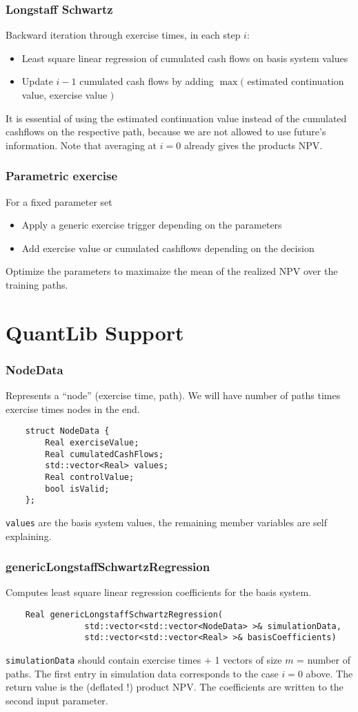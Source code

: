\documentclass{beamer}
\begin{document}
\begin{frame}
\frametitle{Longstaff Schwartz}
Backward iteration through exercise times, in each step $i$:
\begin{itemize}
\item Least square linear regression of cumulated cash flows on basis system values
\item Update $i-1$ cumulated cash flows by adding $\max($ estimated continuation value, exercise value $)$
\end{itemize}
It is essential of using the estimated continuation value instead of the cumulated cashflows
on the respective path, because we are not allowed to use future's information.
Note that averaging at $i=0$ already gives the products NPV.
\end{frame}

\begin{frame}
\frametitle{Parametric exercise}
For a fixed parameter set
\begin{itemize}
\item Apply a generic exercise trigger depending on the parameters
\item Add exercise value or cumulated cashflows depending on the decision
\end{itemize}
Optimize the parameters to maximaize the mean of the realized NPV over the training paths.
\end{frame}


\section{QuantLib Support}

\begin{frame}[fragile]
\frametitle{NodeData}
Represents a ``node'' (exercise time, path). We will have number of paths times
exercise times nodes in the end.
\begin{verbatim}
    struct NodeData {
        Real exerciseValue;
        Real cumulatedCashFlows;
        std::vector<Real> values;
        Real controlValue;
        bool isValid;
    };
\end{verbatim}
\verb+values+ are the basis system values, the remaining member variables are self
explaining.
\end{frame}

\begin{frame}[fragile]
\frametitle{genericLongstaffSchwartzRegression}
Computes least square linear regression coefficients for the basis system.
\begin{verbatim}
    Real genericLongstaffSchwartzRegression(
                std::vector<std::vector<NodeData> >& simulationData,
                std::vector<std::vector<Real> >& basisCoefficients)
\end{verbatim}
\verb+simulationData+ should contain exercise times + 1 vectors of size $m$ = number of paths.
The first entry in simulation data corresponds to the case $i=0$ above.
The return value is the (deflated !) product NPV. The coefficients are written to the second
input parameter.
\end{frame}
\end{document}
